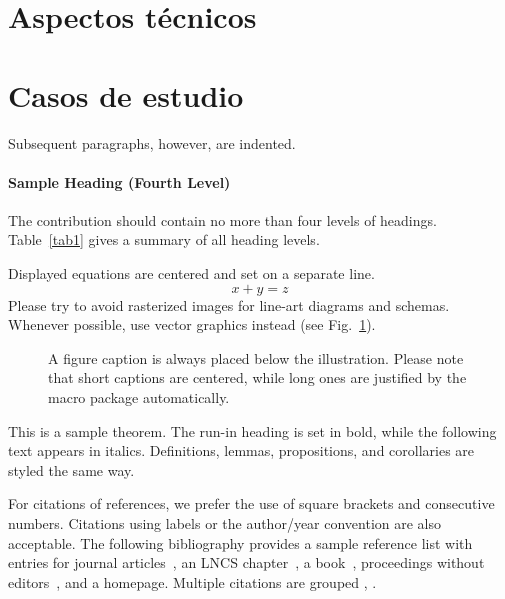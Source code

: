 \documentclass[runningheads]{llncs}
\begin{document}
\section{Aspectos técnicos}

\section{Casos de estudio}


Subsequent paragraphs, however, are indented.

\paragraph{Sample Heading (Fourth Level)}
The contribution should contain no more than four levels of
headings. Table~\ref{tab1} gives a summary of all heading levels.


\noindent Displayed equations are centered and set on a separate
line.
\begin{equation}
x + y = z
\end{equation}
Please try to avoid rasterized images for line-art diagrams and
schemas. Whenever possible, use vector graphics instead (see
Fig.~\ref{fig1}).

\begin{figure}
\caption{A figure caption is always placed below the illustration.
Please note that short captions are centered, while long ones are
justified by the macro package automatically.} \label{fig1}
\end{figure}

\begin{theorem}
This is a sample theorem. The run-in heading is set in bold, while
the following text appears in italics. Definitions, lemmas,
propositions, and corollaries are styled the same way.
\end{theorem}

For citations of references, we prefer the use of square brackets
and consecutive numbers. Citations using labels or the author/year
convention are also acceptable. The following bibliography provides
a sample reference list with entries for journal
articles~\cite{ref_article1}, an LNCS chapter~\cite{ref_lncs1}, a
book~\cite{ref_book1}, proceedings without editors~\cite{ref_proc1},
and a homepage. Multiple citations are grouped
\cite{ref_article1,ref_lncs1,ref_book1},
\cite{ref_article1,ref_book1,ref_proc1}.
\end{document}
